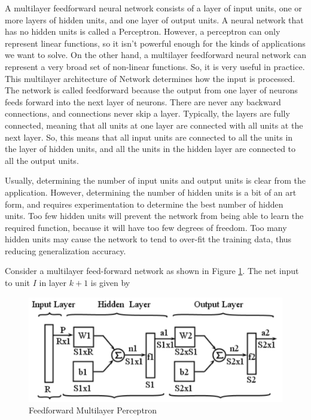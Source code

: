 \documentclass[12pt,a4paper,oneside]{article}
\numberwithin{equation}{section}
\numberwithin{algorithm}{section}
\begin{document}
A multilayer feedforward neural network consists of a layer of input units, one or more layers of hidden units, and one layer of output units. A neural network that has no hidden units is called a Perceptron. However, a perceptron can only represent linear functions, so it isn't powerful enough for the kinds of applications we want to solve. On the other hand, a multilayer feedforward neural network can represent a very broad set of non-linear functions. So, it is very useful in practice. This multilayer architecture of Network determines how the input is processed. The network is called feedforward because the output from one layer of neurons feeds forward into the next layer of neurons. There are never any backward connections, and connections never skip a layer. Typically, the layers are fully connected, meaning that all units at one layer are connected with all units at the next layer. So, this means that all input units are connected to all the units in the layer of hidden units, and all the units in the hidden layer are connected to all the output units.

Usually, determining the number of input units and output units is clear from the application. However, determining the number of hidden units is a bit of an art form, and requires experimentation to determine the best number of hidden units. Too few hidden units will prevent the network from being able to learn the required function, because it will have too few degrees of freedom. Too many hidden units may cause the network to tend to over-fit the training data, thus reducing generalization accuracy.

Consider a multilayer feed-forward network as shown in Figure \ref{figure_mlp}. The net input to unit $I$ in layer $k+1$ is given by

\begin{figure}[hbtp]
\centering
\includegraphics[width=350pt]{figures/MLP}
\caption{Feedforward Multilayer Perceptron}
\label{figure_mlp}
\end{figure}
\end{document}
